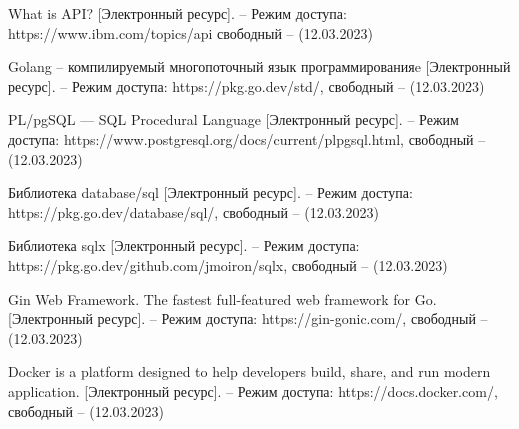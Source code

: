 \begin{thebibliography}{}
		
		What is API?  [Электронный ресурс]. -- Режим доступа: https://www.ibm.com/topics/api свободный -- (12.03.2023)
		 
		
		Golang -- компилируемый многопоточный язык программированияe  [Электронный ресурс]. -- Режим доступа: https://pkg.go.dev/std/, свободный -- (12.03.2023)
		
		PL/pgSQL — SQL Procedural Language [Электронный ресурс]. -- Режим доступа: https://www.postgresql.org/docs/current/plpgsql.html, свободный -- (12.03.2023)
		
		
		Библиотека database/sql [Электронный ресурс]. -- Режим доступа: https://pkg.go.dev/database/sql/,
		свободный -- (12.03.2023)
		
		Библиотека sqlx [Электронный ресурс]. -- Режим доступа: https://pkg.go.dev/github.com/jmoiron/sqlx,
		свободный -- (12.03.2023)
		
		Gin Web Framework. The fastest full-featured web framework for Go. [Электронный ресурс]. -- Режим доступа: https://gin-gonic.com/, свободный -- (12.03.2023)
		
		
		Docker is a platform designed to help developers build, share, and run modern application. [Электронный ресурс]. -- Режим доступа: https://docs.docker.com/, свободный -- (12.03.2023)
		
		
	
		
	
	

\end{thebibliography}
\endgroup

\pagebreak